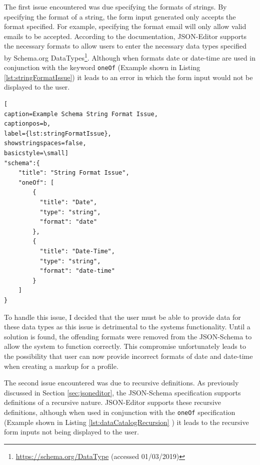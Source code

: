 {%
The first issue encountered was due specifying the formats of strings. By specifying the format of a string, the form input generated only accepts the format specified. For example, specifying the format email will only allow valid emails to be accepted. According to the documentation, JSON-Editor supports the necessary formats to allow users to enter the necessary data types specified by Schema.org DataTypes\footnote{\url{https://schema.org/DataType} (accessed 01/03/2019)}. Although when formats date or date-time are used in conjunction with the keyword \texttt{oneOf} (Example shown in Listing \ref{lst:stringFormatIssue}) it leads to an error in which the form input would not be displayed to the user. \newline

}

{
\begin{center}
\begin{lstlisting}[
caption=Example Schema String Format Issue,
captionpos=b,
label={lst:stringFormatIssue},
showstringspaces=false,
basicstyle=\small]
"schema":{
    "title": "String Format Issue",
    "oneOf": [
        {
          "title": "Date",
          "type": "string",
          "format": "date"
        },
        {
          "title": "Date-Time",
          "type": "string",
          "format": "date-time"
        }
    ]
}
\end{lstlisting}  
\end{center}
}

To handle this issue, I decided that the user must be able to provide data for these data types as this issue is detrimental to the systems functionality. Until a solution is found, the offending formats were removed from the JSON-Schema to allow the system to function correctly. This compromise unfortunately leads to the possibility that user can now provide incorrect formats of date and date-time when creating a markup for a profile.


The second issue encountered was due to recursive definitions. As previously discussed in Section \ref{sec:jsoneditor}, the JSON-Schema specification supports definitions of a recursive nature. JSON-Editor supports these recursive definitions, although when used in conjunction with the \texttt{oneOf} specification (Example shown in Listing \ref{lst:dataCatalogRecursion} ) it leads to the recursive form inputs not being displayed to the user.\newline

